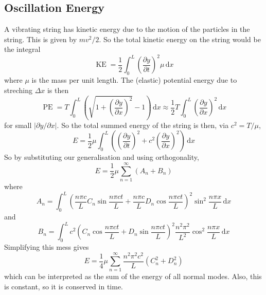 \subsection{Oscillation Energy}
A vibrating string has kinetic energy due to the motion of the particles in the string.
This is given by $mv^2/2$.
So the total kinetic energy on the string would be the integral
$$\operatorname{KE}=\frac{1}{2}\int_0^L\left(\frac{\partial y}{\partial t}\right)^2\mu\,\mathrm dx$$
where $\mu$ is the mass per unit length.
The (elastic) potential energy due to streching $\Delta x$ is then
$$\operatorname{PE}=T\int_0^L\left( \sqrt{1+\left( \frac{\partial y}{\partial x} \right)^2} -1\right)\,\mathrm dx\approx\frac{1}{2}T\int_0^L\left( \frac{\partial y}{\partial x} \right)^2\,\mathrm dx$$
for small $|\partial y/\partial x|$.
So the total summed energy of the string is then, via $c^2=T/\mu$,
$$E=\frac{1}{2}\mu\int_0^L\left( \left( \frac{\partial y}{\partial t} \right)^2+c^2\left(\frac{\partial y}{\partial x}\right)^2 \right)\,\mathrm dx$$
So by substituting our generalisation and using orthogonality,
$$E=\frac{1}{2}\mu\sum_{n=1}^\infty (A_n+B_n)$$
where
$$A_n=\int_0^L \left( \frac{n\pi c}{L}C_n\sin\frac{n\pi ct}{L}+ \frac{n\pi c}{L}D_n\cos\frac{n\pi ct}{L}\right)^2\sin^2\frac{n\pi x}{L}\,\mathrm dx$$
and
$$B_n=\int_0^Lc^2\left( C_n\cos\frac{n\pi ct}{L}+ D_n\sin\frac{n\pi ct}{L}\right)^2\frac{n^2\pi^2}{L^2}\cos^2\frac{n\pi x}{L}\,\mathrm dx$$
Simplifying this mess gives
$$E=\frac{1}{4}\mu\sum_{n=1}^\infty\frac{n^2\pi^2c^2}{L}(C_n^2+D_n^2)$$
which can be interpreted as the sum of the energy of all normal modes.
Also, this is constant, so it is conserved in time.
